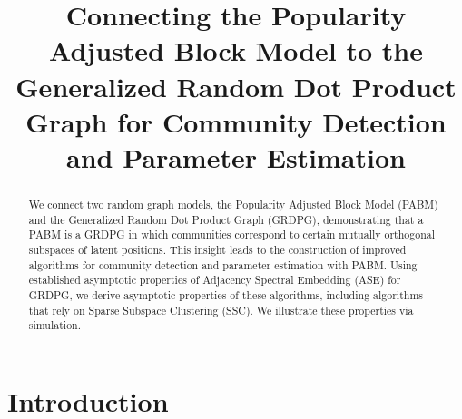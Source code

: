 \documentclass[12pt]{article}
\title{Connecting the Popularity Adjusted Block Model to the Generalized Random
Dot Product Graph for Community Detection and Parameter Estimation}
\author{}
\date{\vspace{-2.5em}}
\def\spacingset#1{\renewcommand{\baselinestretch}%
{#1}\small\normalsize} \spacingset{1}
\providecommand{\tightlist}{%
  \setlength{\itemsep}{0pt}\setlength{\parskip}{0pt}}
\begin{document}
\maketitle
\begin{abstract}
We connect two random graph models, the Popularity Adjusted Block Model
(PABM) and the Generalized Random Dot Product Graph (GRDPG),
demonstrating that a PABM is a GRDPG in which communities correspond to
certain mutually orthogonal subspaces of latent positions. This insight
leads to the construction of improved algorithms for community detection
and parameter estimation with PABM. Using established asymptotic
properties of Adjacency Spectral Embedding (ASE) for GRDPG, we derive
asymptotic properties of these algorithms, including algorithms that
rely on Sparse Subspace Clustering (SSC). We illustrate these properties
via simulation.
\end{abstract}

\providecommand{\tightlist}{%
  \setlength{\itemsep}{0pt}\setlength{\parskip}{0pt}}
\newcommand{\diag}{\text{diag}}
\newcommand{\tr}{\text{Tr}}
\newcommand{\blockdiag}{\text{blockdiag}}
\newcommand{\indep}{\stackrel{\text{indep}}{\sim}}
\newcommand{\iid}{\stackrel{\text{iid}}{\sim}}
\newcommand{\Bernoulli}{\text{Bernoulli}}
\newcommand{\Betadist}{\text{Beta}}
\newcommand{\BG}{\text{BernoulliGraph}}
\newcommand{\PABM}{\text{PABM}}
\newcommand{\RDPG}{\text{RDPG}}
\newcommand{\GRDPG}{\text{GRDPG}}
\newcommand{\Multinomial}{\text{Multinomial}}
\newtheorem{definition}{Definition}
\newtheorem{theorem}{Theorem}
\newtheorem{lemma}{Lemma}
\theoremstyle{remark}
\newtheorem*{remark}{Remark}
\theoremstyle{definition}
\newtheorem*{example}{Example}
\newpage
\spacingset{1.5} %

\hypertarget{introduction}{%
\section{Introduction}\label{introduction}}
\end{document}
